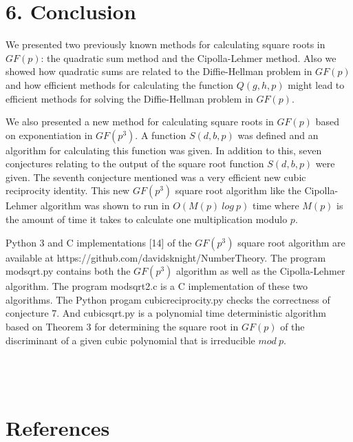 \documentclass[final,letterpaper,oneside,10pt]{article}
\begin{document}
\section*{6. Conclusion}

We presented two previously known methods for calculating square roots in $GF(p)$: the quadratic sum method and the Cipolla-Lehmer method.
Also we showed how quadratic sums are related to the Diffie-Hellman problem in $GF(p)$ and how efficient methods for calculating the function 
$Q(g,h,p)$ might lead to efficient methods for solving the Diffie-Hellman problem in $GF(p)$.

We also presented a new method for calculating square roots in $GF(p)$ based on exponentiation in $GF(p^3)$.  A function $S(d,b,p)$ was defined and
an algorithm for calculating this function was given.  In addition to this, seven conjectures relating to the output of the square root function $S(d,b,p)$
were given.  The seventh conjecture mentioned was a very efficient new cubic reciprocity identity.
This new $GF(p^3)$ square root algorithm like the Cipolla-Lehmer algorithm was shown to run in $O(M(p)~log~p)$ time where $M(p)$ is
the amount of time it takes to calculate one multiplication modulo $p$.

Python 3 and C implementations [14] of the $GF(p^{3})$ square root algorithm are available at https://github.com/davidsknight/NumberTheory.  The program modsqrt.py contains both the $GF(p^{3})$ algorithm as well as the Cipolla-Lehmer algorithm.  The program modsqrt2.c is a C implementation of these two algorithms.  The Python progam cubicreciprocity.py checks the correctness of conjecture 7.  And cubicsqrt.py is a polynomial time deterministic algorithm based on Theorem 3 for determining the square root in $GF(p)$ of the discriminant of a given cubic polynomial that is irreducible $mod~ p$. 
\\
\\
\\
\\
\section*{References }
\end{document}
